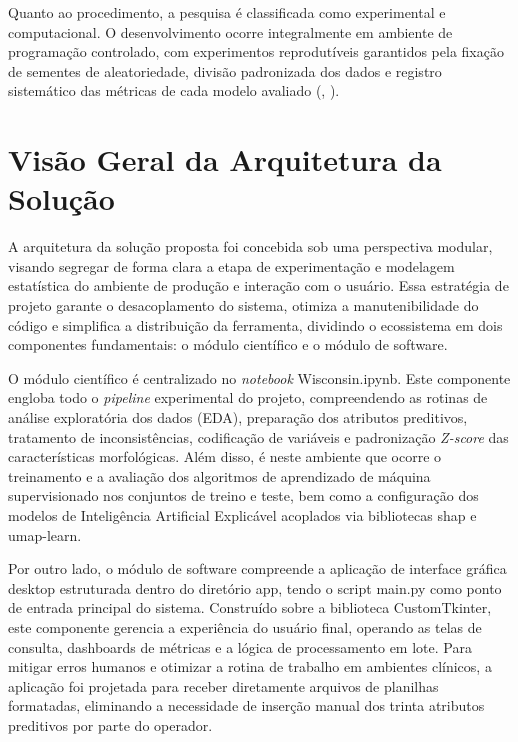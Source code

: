 \documentclass[
    12pt
    ,oneside
    ,a4paper
    ,chapter=TITLE
    ,section=TITLE
    ,sumario=abnt-6027-2012
    ,english,brazil]{abntex2} %
\begin{document}
Quanto ao procedimento, a pesquisa é classificada como experimental e
computacional. O desenvolvimento ocorre integralmente em ambiente de programação
controlado, com experimentos reprodutíveis garantidos pela fixação de sementes de
aleatoriedade, divisão padronizada dos dados e registro sistemático das métricas
de cada modelo avaliado (, \citeyear{Faceli2011}).

\section{Visão Geral da Arquitetura da Solução}
\label{sec:visao-geral}

A arquitetura da solução proposta foi concebida sob uma perspectiva modular,
visando segregar de forma clara a etapa de experimentação e modelagem estatística
do ambiente de produção e interação com o usuário. Essa estratégia de projeto
garante o desacoplamento do sistema, otimiza a manutenibilidade do código e
simplifica a distribuição da ferramenta, dividindo o ecossistema em dois
componentes fundamentais: o módulo científico e o módulo de software.

O módulo científico é centralizado no \textit{notebook} Wisconsin.ipynb. Este
componente engloba todo o \textit{pipeline} experimental do projeto,
compreendendo as rotinas de análise exploratória dos dados (EDA), preparação
dos atributos preditivos, tratamento de inconsistências, codificação de variáveis
e padronização \textit{Z-score} das características morfológicas. Além disso, é
neste ambiente que ocorre o treinamento e a avaliação dos algoritmos de
aprendizado de máquina supervisionado nos conjuntos de treino e teste, bem como
a configuração dos modelos de Inteligência Artificial Explicável acoplados via
bibliotecas shap e umap-learn.

Por outro lado, o módulo de software compreende a aplicação de interface gráfica
desktop estruturada dentro do diretório app, tendo o script main.py como ponto
de entrada principal do sistema. Construído sobre a biblioteca CustomTkinter,
este componente gerencia a experiência do usuário final, operando as telas de
consulta, dashboards de métricas e a lógica de processamento em lote. Para
mitigar erros humanos e otimizar a rotina de trabalho em ambientes clínicos, a
aplicação foi projetada para receber diretamente arquivos de planilhas
formatadas, eliminando a necessidade de inserção manual dos trinta atributos
preditivos por parte do operador.
\end{document}
